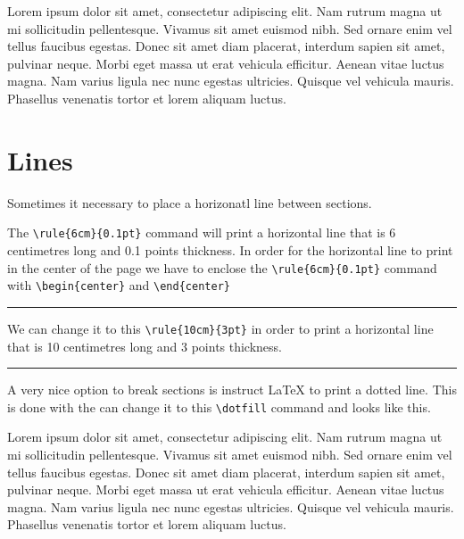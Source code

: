 Lorem ipsum dolor sit amet, consectetur adipiscing elit. Nam rutrum magna ut mi sollicitudin pellentesque. Vivamus sit amet euismod nibh. Sed ornare enim vel tellus faucibus egestas. Donec sit amet diam placerat, interdum sapien sit amet, pulvinar neque. Morbi eget massa ut erat vehicula efficitur. Aenean vitae luctus magna. Nam varius ligula nec nunc egestas ultricies. Quisque vel vehicula mauris. Phasellus venenatis tortor et lorem aliquam luctus.


\section{Lines}

Sometimes it necessary to place a horizonatl line between sections.

The \verb|\rule{6cm}{0.1pt}| command will print a horizontal line that is 6 centimetres long and 0.1 points thickness. In order for the horizontal line to print in the center of the page we have to enclose the \verb|\rule{6cm}{0.1pt}| command with \verb|\begin{center}| and \verb|\end{center}|

\begin{center}
    \rule{6cm}{0.1pt}
\end{center}

We can change it to this \verb|\rule{10cm}{3pt}| in order to print a horizontal line that is 10 centimetres long and 3 points thickness. 

\begin{center}
    \rule{10cm}{2pt}
\end{center}


A very nice option to break sections is instruct LaTeX to print a dotted line. This is done with the  can change it to this \verb|\dotfill| command and looks like this. 

 \dotfill

Lorem ipsum dolor sit amet, consectetur adipiscing elit. Nam rutrum magna ut mi sollicitudin pellentesque. Vivamus sit amet euismod nibh. Sed ornare enim vel tellus faucibus egestas. Donec sit amet diam placerat, interdum sapien sit amet, pulvinar neque. Morbi eget massa ut erat vehicula efficitur. Aenean vitae luctus magna. Nam varius ligula nec nunc egestas ultricies. Quisque vel vehicula mauris. Phasellus venenatis tortor et lorem aliquam luctus.

